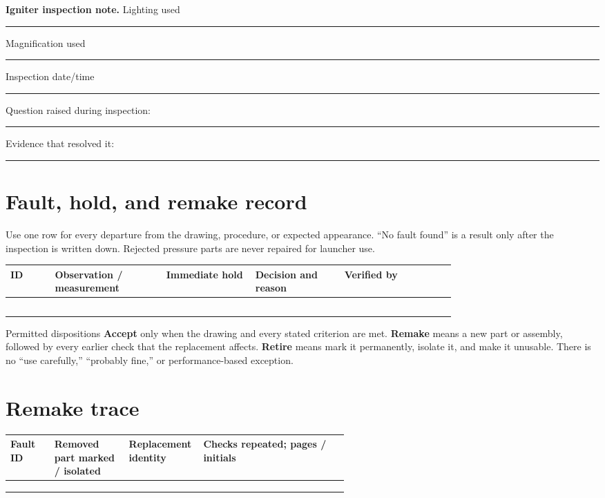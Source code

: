 \begin{telosframe}
\textbf{Igniter inspection note.} Lighting used \rule{0.19\linewidth}{0.4pt}
\quad Magnification used \rule{0.15\linewidth}{0.4pt}
\quad Inspection date/time \rule{0.22\linewidth}{0.4pt}\par
\smallskip
Question raised during inspection: \rule{0.64\linewidth}{0.4pt}\par
\smallskip
Evidence that resolved it: \rule{0.70\linewidth}{0.4pt}
\end{telosframe}

\newpage
\section{Fault, hold, and remake record}
Use one row for every departure from the drawing, procedure, or expected
appearance. ``No fault found'' is a result only after the inspection is written
down. Rejected pressure parts are never repaired for launcher use.

\begin{tabularx}{\linewidth}{@{}p{0.10\linewidth}p{0.25\linewidth}p{0.20\linewidth}p{0.20\linewidth}L@{}}
\toprule
\textbf{ID} & \textbf{Observation / measurement} & \textbf{Immediate hold} &
\textbf{Decision and reason} & \textbf{Verified by}\\
\midrule
& & & & \\[1.15em]
& & & & \\[1.15em]
& & & & \\[1.15em]
& & & & \\[1.15em]
& & & & \\
\bottomrule
\end{tabularx}

\begin{telospanel}{Permitted dispositions}
\textbf{Accept} only when the drawing and every stated criterion are met.
\textbf{Remake} means a new part or assembly, followed by every earlier check
that the replacement affects. \textbf{Retire} means mark it permanently, isolate
it, and make it unusable. There is no ``use carefully,'' ``probably fine,'' or
performance-based exception.
\end{telospanel}

\section{Remake trace}
\begin{tabularx}{\linewidth}{@{}p{0.13\linewidth}p{0.22\linewidth}p{0.22\linewidth}L@{}}
\toprule
\textbf{Fault ID} & \textbf{Removed part marked / isolated} &
\textbf{Replacement identity} & \textbf{Checks repeated; pages / initials}\\
\midrule
& & & \\[0.9em]
& & & \\[0.9em]
& & & \\
\bottomrule
\end{tabularx}

